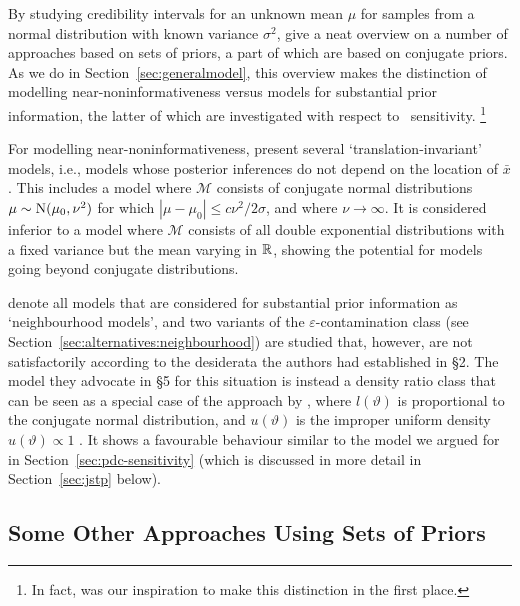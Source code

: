 By studying credibility intervals for an unknown mean $\mu$ for samples from a normal distribution with known variance $\sigma^2$,
\textcite{1991:pericchi} give a neat overview on a number of approaches based on sets of priors,
a part of which are based on conjugate priors.
As we do in Section~\ref{sec:generalmodel},
this overview makes the distinction of modelling near-noninformativeness
versus models for substantial prior information,
the latter of which are investigated with respect to \pdc\ sensitivity.%
\footnote{In fact, \textcite{1991:pericchi} was our inspiration to make this distinction in the first place.}

For modelling near-noninformativeness, \textcite[\S 3]{1991:pericchi}
present several `translation-invariant' models,
i.e., models whose posterior inferences do not depend on the location of $\bar{x}$.
This includes a model where $\mathcal{M}$ consists of conjugate normal distributions $\mu \sim \operatorname{N}(\mu_0, \nu^2)$
for which $|\mu - \mu_0| \le c \nu^2 / 2\sigma$, and where $\nu \to \infty$.
It is considered inferior to a model where $\mathcal{M}$ consists of all double exponential distributions
with a fixed variance but the mean varying in $\mathbb{R}$, %
showing the potential for models going beyond conjugate distributions.

\textcite[\S 4]{1991:pericchi} denote all models that are considered
for substantial prior information as `neighbourhood models',
and two variants of the $\varepsilon$-contamination class (see Section~\ref{sec:alternatives:neighbourhood}) are studied
that, however, are not satisfactorily according to the desiderata the authors had established in \S 2.
The model they advocate in \S 5 for this situation %
is instead a density ratio class that
can be seen as a special case of the approach by \textcite[see below]{2011:rinderknecht:diss},
where $l(\vartheta)$ is proportional to the conjugate normal distribution,
and $u(\vartheta)$ is the improper uniform density $u(\vartheta) \propto 1$ \parencite[\S 4.3]{1991:pericchi}.
It shows a favourable behaviour similar to the model we argued for in Section~\ref{sec:pdc-sensitivity}
(which is discussed in more detail in Section~\ref{sec:jstp} below).


\subsection{Some Other Approaches Using Sets of Priors}
\label{sec:alternatives:other}

